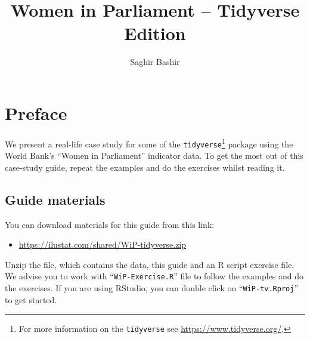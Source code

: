 \documentclass[a4paper,9pt,twocolumn,twoside,]{pinp}
\title{Women in Parliament -- Tidyverse Edition}
\author[]{Saghir Bashir}
\providecommand{\tightlist}{%
  \setlength{\itemsep}{0pt}\setlength{\parskip}{0pt}}
\begin{document}
\verticaladjustment{-2pt}

\maketitle
\thispagestyle{firststyle}




\hypertarget{preface}{%
\section{Preface}\label{preface}}

We present a real-life case study for some of the
\texttt{tidyverse}\footnote{For more information on the
  \texttt{tidyverse} see \url{https://www.tidyverse.org/}.} package
using the World Bank's ``Women in Parliament'' indicator data. To get
the most out of this case-study guide, repeat the examples and do the
exercises whilst reading it.

\hypertarget{guide-materials}{%
\subsection{Guide materials}\label{guide-materials}}

You can download materials for this guide from this link:

\begin{itemize}
\tightlist
\item
  \url{https://ilustat.com/shared/WiP-tidyverse.zip}
\end{itemize}

Unzip the file, which contains the data, this guide and an R script
exercise file. We advise you to work with ``\texttt{WiP-Exercise.R}''
file to follow the examples and do the exercises. If you are using
RStudio, you can double click on ``\texttt{WiP-tv.Rproj}'' to get
started.
\end{document}
